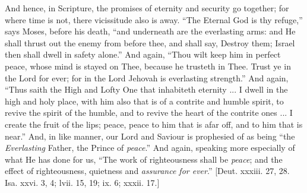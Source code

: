 And hence, in Scripture, the promises of eternity and security go
together; for where time is not, there vicissitude also is away.
``The Eternal God is thy refuge,'' says Moses, before his
death, ``and underneath are the everlasting arms: and He shall
thrust out the enemy from before thee, and shall say, Destroy them;
Israel then shall dwell in safety alone.'' And again, ``Thou
wilt keep him in perfect peace, whose mind is stayed on Thee, because
he trusteth in Thee. Trust ye in the Lord for ever; for in the Lord
Jehovah is everlasting strength.'' And again, ``Thus saith the
High and Lofty One that inhabiteth eternity ... I dwell in the high
and holy place, with him also that is of a contrite and humble spirit,
to revive the spirit of the humble, and to revive the heart of the
contrite ones ... I create the fruit of the lips; peace, peace to him
that is afar off, and to him that is near.'' And, in like manner,
our Lord and Saviour is prophesied of as being ``the \emph{Everlasting}
Father, the Prince of \emph{peace}.'' And again, speaking more
especially of what He has done for us, ``The work of righteousness
shall be \emph{peace}; and the effect of righteousness, quietness and \emph{assurance
for ever}.'' [Deut. xxxiii. 27, 28. Isa. xxvi. 3, 4; lvii. 15,
19; ix. 6; xxxii. 17.]

